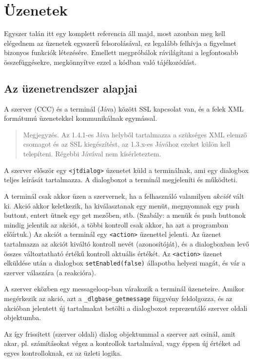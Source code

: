 
\section{Üzenetek}

Egyszer talán itt egy komplett referencia áll majd,
most azonban meg kell elégednem az üzenetek egyszerű felsorolásával,
ez legalább felhívja a figyelmet bizonyos funkciók létezésére.
Emellett megpróbálok rávilágítani a legfontosabb összefüggésekre, 
megkönnyítve ezzel a kódban való tájékozódást.  

\subsection{Az üzenetrendszer alapjai}

A szerver (CCC) és a terminál (Jáva) között SSL kapcsolat van,
és a felek XML formátumú üzenetekkel kommunikálnak egymással.

\begin{quote}\small
    Megjegyzés. Az 1.4.1-es Jáva helyből tartalmazza a szükséges 
    XML elemző csomagot és az SSL kiegészítést, az 1.3.x-es Jávához 
    ezeket külön kell telepíteni.  Régebbi Jávával nem kísérleteztem.
\end{quote}

A szerver először egy \verb!<jtdialog>! üzenetet küld a terminálnak,
ami egy dialogbox teljes leírását tartalmazza. A dialogboxot a terminál
megjeleníti és működteti. 

A terminál csak akkor üzen a szervernek, ha a felhasználó valamilyen
{\em akciót} vált ki. Akció akkor keletkezik, ha kiválasztanak egy
menüt, megnyomnak egy push buttont, entert ütnek egy get mezőben, stb.
(Szabály: a menük és push buttonok mindig jelentik az akciót, a többi
kontroll csak akkor, ha azt a programban előírtuk.)
Az akciót a terminál egy \verb!<action>! üzenettel jelenti.
Az üzenet tartalmazza az akciót kiváltó kontroll nevét (azonosítóját),
és  a dialogboxban levő  összes változtatható értékű kontroll
aktuális értékét. Az \verb!<action>! üzenet elküldése után
a dialogbox \verb!setEnabled(false)! állapotba helyezi magát, 
és vár a szerver válaszára (a reakcióra).

A szerver eközben egy messageloop-ban várakozik a terminál
üzeneteire. Amikor megérkezik az akció, azt a \verb!_dlgbase_getmessage!
függvény feldolgozza, és az akcióban jelentett új tartalmakat
betölti a dialogboxot reprezentáló szerver oldali objektumba.

Az így frissített (szerver oldali) dialog objektummal a szerver azt csinál, 
amit akar, pl. számításokat végez a kontrollok tartalmával, 
vagy éppen új értéket ad egyes kontrolloknak, ez az üzleti logika. 

